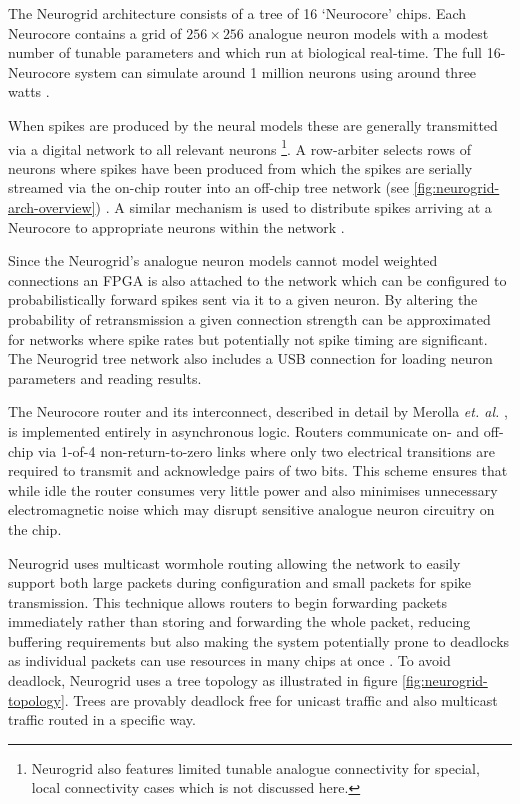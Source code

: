				The Neurogrid architecture consists of a tree of 16 `Neurocore' chips.
				Each Neurocore contains a grid of $256 \times 256$ analogue neuron
				models with a modest number of tunable parameters and which run at
				biological real-time. The full 16-Neurocore system can simulate around 1
				million neurons using around three watts \cite{benjamin14}.
				
				When spikes are produced by the neural models these are generally
				transmitted via a digital network to all relevant neurons
				\footnote{Neurogrid also features limited tunable analogue connectivity
				for special, local connectivity cases which is not discussed here.}. A
				row-arbiter selects rows of neurons where spikes have been produced from
				which the spikes are serially streamed via the on-chip router into an
				off-chip tree network (see \ref{fig:neurogrid-arch-overview})
				\cite{boahen04}. A similar mechanism is used to distribute spikes
				arriving at a Neurocore to appropriate neurons within the network
				\cite{boahen04receiver}.
				
				Since the Neurogrid's analogue neuron models cannot model weighted
				connections an FPGA is also attached to the network which can be
				configured to probabilistically forward spikes sent via it to a given
				neuron. By altering the probability of retransmission a given connection
				strength can be approximated for networks where spike rates but
				potentially not spike timing are significant.  The Neurogrid tree
				network also includes a USB connection for loading neuron parameters and
				reading results. 
				
				The Neurocore router and its interconnect, described in detail by
				Merolla \emph{et. al.} \cite{merolla14}, is implemented entirely in
				asynchronous logic. Routers communicate on- and off-chip via 1-of-4
				non-return-to-zero links where only two electrical transitions are
				required to transmit and acknowledge pairs of two bits. This scheme
				ensures that while idle the router consumes very little power and also
				minimises unnecessary electromagnetic noise which may disrupt sensitive
				analogue neuron circuitry on the chip.
				
				Neurogrid uses multicast wormhole routing allowing the network to easily
				support both large packets during configuration and small packets for
				spike transmission. This technique allows routers to begin forwarding
				packets immediately rather than storing and forwarding the whole packet,
				reducing buffering requirements but also making the system potentially
				prone to deadlocks as individual packets can use resources in many chips
				at once \cite{dally04}. To avoid deadlock, Neurogrid uses a tree
				topology as illustrated in figure \ref{fig:neurogrid-topology}. Trees
				are provably deadlock free for unicast traffic and also multicast
				traffic routed in a specific way.
				
